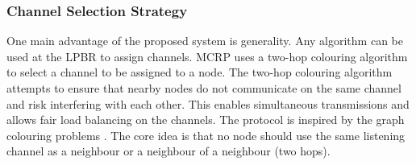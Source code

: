\subsubsection{Channel Selection Strategy}
One main advantage of the proposed system is generality. Any algorithm can be used at the LPBR to assign channels. MCRP uses a two-hop colouring algorithm to select a channel to be assigned to a node.
The two-hop colouring algorithm attempts to ensure that nearby nodes do not communicate on the same channel and risk interfering with each other. This enables simultaneous transmissions and allows fair load balancing on the channels. The protocol is inspired by the graph colouring problems \cite{graphColouring}. The core idea is that no node should use the same listening channel as a neighbour or a neighbour of a neighbour (two hops).





